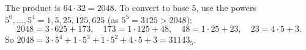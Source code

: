 The product is $64\cdot32=2048$. To convert to base $5$, use the powers $5^0,\dots,5^4=1,5,25,125,625$ (as $5^5=3125>2048$):
\[
2048=3\cdot625+173,\quad173=1\cdot125+48,\quad48=1\cdot25+23,\quad23=4\cdot5+3 .
\]
So $2048=3\cdot5^4+1\cdot5^3+1\cdot5^2+4\cdot5+3=\boxed{31143_5}$.
